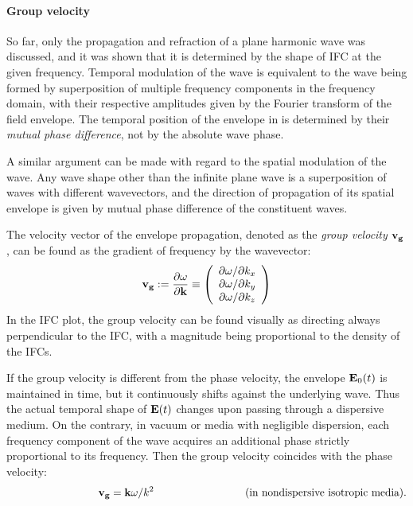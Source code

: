 \paragraph{Group velocity}  %
So far, only the propagation and refraction of a plane harmonic wave was discussed, and it was shown that it is determined by the shape of IFC at the given frequency.
Temporal modulation of the wave 
is equivalent to the wave being formed by superposition of multiple frequency components in the frequency domain, with their respective amplitudes given by the Fourier transform of the field envelope. The temporal position of the envelope in is determined by their \textit{mutual phase difference}, not by the absolute wave phase. 

A similar argument can be made with regard to the spatial modulation of the wave. Any wave shape other than the infinite plane wave is a superposition of waves with different wavevectors, and the direction of propagation of its spatial envelope is given by mutual phase difference of the constituent waves. %

The velocity vector of the envelope propagation, denoted as the \textit{group velocity} ${\mathbf{v_g}}$, can be found as the gradient of frequency by the wavevector: %
\begin{equation} {\mathbf{v_g}} := \frac{\partial \omega}{\partial {\mathbf{k}}} \equiv 
\left(\begin{array}{c} 
	\partial \omega/\partial k_x \\ 
	\partial \omega/\partial k_y \\ 
	\partial \omega/\partial k_z \\ 
	\end{array} \right)
 \label{eq_vg}\end{equation}
In the IFC plot, the group velocity can be found visually as directing always perpendicular to the IFC, with a magnitude being proportional to the density of the IFCs.

If the group velocity is different from the phase velocity, the envelope $\mathbf{E}_0(t)$ is maintained in time, but it continuously shifts against the underlying wave. Thus the actual temporal shape of $\mathbf{E}(t)$ changes upon passing through a dispersive medium.
On the contrary, in vacuum or media with negligible dispersion, each frequency component of the wave acquires an additional phase strictly proportional to its frequency. Then the group velocity coincides with the phase velocity: 
$$\hspace{3cm}\vg = \kk \omega / k^2 \hspace{3cm} \text{(in nondispersive isotropic media)}.$$

